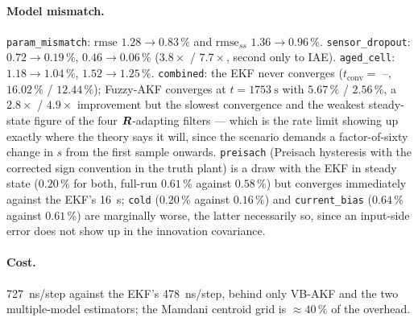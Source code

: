 \paragraph{Model mismatch.}  \texttt{param\_mismatch}: $\mathrm{rmse}$ $1.28\to0.83\,\%$ and
$\mathrm{rmse}_{ss}$ $1.36\to0.96\,\%$.  \texttt{sensor\_dropout}: $0.72\to0.19\,\%$,
$0.46\to0.06\,\%$ ($3.8\times$ / $7.7\times$, second only to IAE).  \texttt{aged\_cell}:
$1.18\to1.04\,\%$, $1.52\to1.25\,\%$.  \texttt{combined}: the EKF never converges
($t_\mathrm{conv}=$ --, $16.02\,\%$ / $12.44\,\%$); Fuzzy-AKF converges at $t=\SI{1753}{\second}$
with $5.67\,\%$ / $2.56\,\%$, a $2.8\times$ / $4.9\times$ improvement but the slowest convergence and
the weakest steady-state figure of the four $\bm{R}$-adapting filters --- which is the rate limit showing
up exactly where the theory says it will, since the scenario demands a factor-of-sixty change in $s$
from the first sample onwards.  \texttt{preisach} (Preisach hysteresis with the corrected sign
convention in the truth plant) is a draw with the EKF in steady state ($0.20\,\%$ for both, full-run
$0.61\,\%$ against $0.58\,\%$) but converges immediately against the EKF's \SI{16}{\second};
\texttt{cold} ($0.20\,\%$ against $0.16\,\%$) and \texttt{current\_bias} ($0.64\,\%$ against
$0.61\,\%$) are marginally worse, the latter necessarily so, since an input-side error does not show
up in the innovation covariance.

\paragraph{Cost.}  \SI{727}{\nano\second}/step against the EKF's \SI{478}{\nano\second}/step, behind
only VB-AKF and the two multiple-model estimators; the Mamdani centroid grid is $\approx40\,\%$ of the
overhead.

